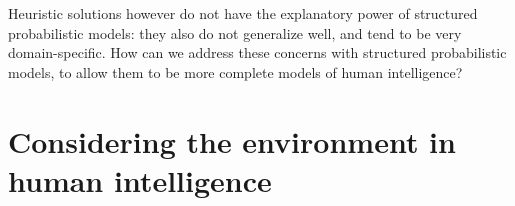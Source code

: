 Heuristic solutions however do not have the explanatory power of structured probabilistic models: they also do not generalize well, and tend to be very domain-specific. How can we address these concerns with structured probabilistic models, to allow them to be more complete models of human intelligence?




\section*{Considering the environment in human intelligence}

